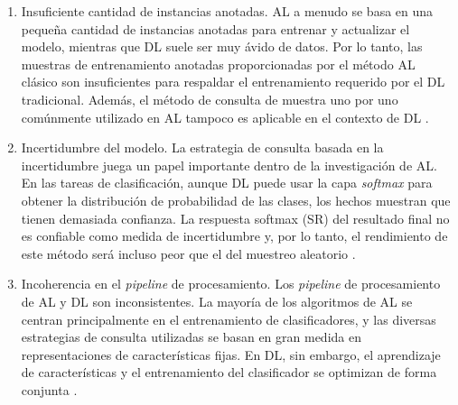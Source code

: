 \begin{enumerate}
	\item Insuficiente cantidad de instancias anotadas. AL a menudo se basa en una pequeña cantidad de instancias anotadas para entrenar y actualizar el modelo, mientras que DL suele ser muy ávido de datos. Por lo tanto, las muestras de entrenamiento anotadas proporcionadas por el método AL clásico son insuficientes para respaldar el entrenamiento requerido por el DL tradicional. Además, el método de consulta de muestra uno por uno comúnmente utilizado en AL tampoco es aplicable en el contexto de DL \cite{zhdanov2019diverse}.
	\item Incertidumbre del modelo. La estrategia de consulta basada en la incertidumbre juega un papel importante dentro de la investigación de AL. En las tareas de clasificación, aunque DL puede usar la capa \textit{softmax} para obtener la distribución de probabilidad de las clases, los hechos muestran que tienen demasiada confianza. La respuesta softmax (SR) \cite{wang2017cost} del resultado final no es confiable como medida de incertidumbre y, por lo tanto, el rendimiento de este método será incluso peor que el del muestreo aleatorio \cite{wang2014anew}. 
	
	\item Incoherencia en el \textit{pipeline} de procesamiento. Los \textit{pipeline} de procesamiento de AL y DL son inconsistentes. La mayoría de los algoritmos de AL se centran principalmente en el entrenamiento de clasificadores, y las diversas estrategias de consulta utilizadas se basan en gran medida en representaciones de características fijas. En DL, sin embargo, el aprendizaje de características y el entrenamiento del clasificador se optimizan de forma conjunta \cite{wang2017cost}.
	
\end{enumerate}


